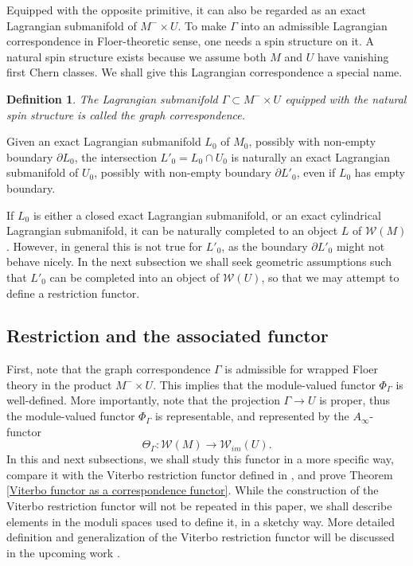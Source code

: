 \documentclass{amsart}
\newtheorem{definition}[theorem]{Definition}
\numberwithin{equation}{section}
\numberwithin{figure}{section}
\begin{document}
	 Equipped with the opposite primitive, it can also be regarded as an exact Lagrangian submanifold of $M^{-} \times U$. To make $\Gamma$ into an admissible Lagrangian correspondence in Floer-theoretic sense, one needs a spin structure on it. A natural spin structure exists because we assume both $M$ and $U$ have vanishing first Chern classes. We shall give this Lagrangian correspondence a special name. \par

\begin{definition}
	The Lagrangian submanifold $\Gamma \subset M^{-} \times U$ equipped with the natural spin structure is called the graph correspondence.
\end{definition}

	Given an exact Lagrangian submanifold $L_{0}$ of $M_{0}$, possibly with non-empty boundary $\partial L_{0}$, the intersection $L'_{0} = L_{0} \cap U_{0}$ is naturally an exact Lagrangian submanifold of $U_{0}$, possibly with non-empty boundary $\partial L'_{0}$, even if $L_{0}$ has empty boundary. \par
	If $L_{0}$ is either a closed exact Lagrangian submanifold, or an exact cylindrical Lagrangian submanifold, it can be naturally completed to an object $L$ of $\mathcal{W}(M)$. However, in general this is not true for $L'_{0}$, as the boundary $\partial L'_{0}$ might not behave nicely. In the next subsection we shall seek geometric assumptions such that $L'_{0}$ can be completed into an object of $\mathcal{W}(U)$, so that we may attempt to define a restriction functor. \par

\subsection{Restriction and the associated functor}
	First, note that the graph correspondence $\Gamma$ is admissible for wrapped Floer theory in the product $M^{-} \times U$. This implies that the module-valued functor $\Phi_{\Gamma}$ is well-defined. More importantly, note that the projection $\Gamma \to U$ is proper, thus the module-valued functor $\Phi_{\Gamma}$ is representable, and represented by the $A_{\infty}$-functor
\begin{equation}\label{the restriction functor associated to the graph}
\Theta_{\Gamma}: \mathcal{W}(M) \to \mathcal{W}_{im}(U).
\end{equation}
In this and next subsections, we shall study this functor in a more specific way, compare it with the Viterbo restriction functor defined in \cite{Abouzaid-Seidel}, and prove Theorem \ref{Viterbo functor as a correspondence functor}. While the construction of the Viterbo restriction functor will not be repeated in this paper, we shall describe elements in the moduli spaces used to define it, in a sketchy way. More detailed definition and generalization of the Viterbo restriction functor will be discussed in the upcoming work \cite{Gao2}. \par
\end{document}
